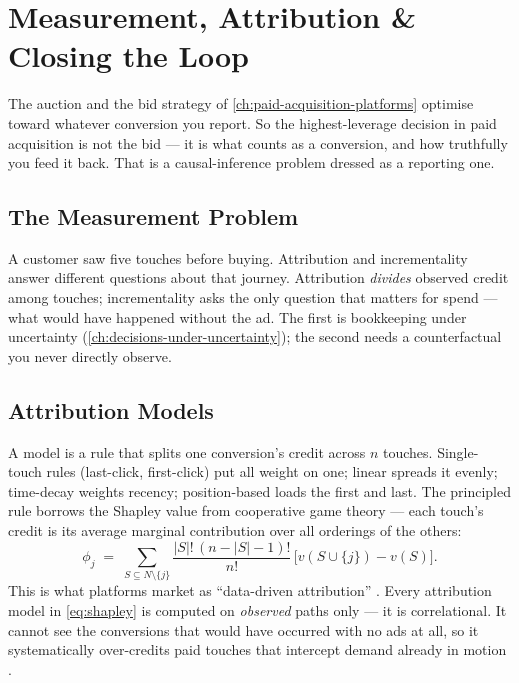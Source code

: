 \chapter{Measurement, Attribution \& Closing the Loop}\label{ch:attribution-and-measurement}


The auction and the bid strategy of \cref{ch:paid-acquisition-platforms} optimise toward whatever conversion you report. So the highest-leverage decision in paid acquisition is not the bid --- it is what counts as a conversion, and how truthfully you feed it back. That is a causal-inference problem dressed as a reporting one.

\section{The Measurement Problem}\label{sec:measurement-problem}

A customer saw five touches before buying. Attribution and incrementality answer different questions about that journey. Attribution \emph{divides} observed credit among touches; incrementality asks the only question that matters for spend --- what would have happened without the ad. The first is bookkeeping under uncertainty (\cref{ch:decisions-under-uncertainty}); the second needs a counterfactual you never directly observe.

\section{Attribution Models}\label{sec:attribution-models}

A model is a rule that splits one conversion's credit across $n$ touches. Single-touch rules (last-click, first-click) put all weight on one; linear spreads it evenly; time-decay weights recency; position-based loads the first and last. The principled rule borrows the Shapley value from cooperative game theory --- each touch's credit is its average marginal contribution over all orderings of the others:
\begin{equation}\label{eq:shapley}
  \phi_j \;=\; \sum_{S\subseteq N\setminus\{j\}} \frac{|S|!\,(n-|S|-1)!}{n!}\,\bigl[v(S\cup\{j\})-v(S)\bigr].
\end{equation}
This is what platforms market as ``data-driven attribution'' \parencite{li2014attributing,gads6259715,ga10596866}. Every attribution model in \cref{eq:shapley} is computed on \emph{observed} paths only --- it is correlational. It cannot see the conversions that would have occurred with no ads at all, so it systematically over-credits paid touches that intercept demand already in motion \parencite{anderl2016mapping,berman2018economics}.

